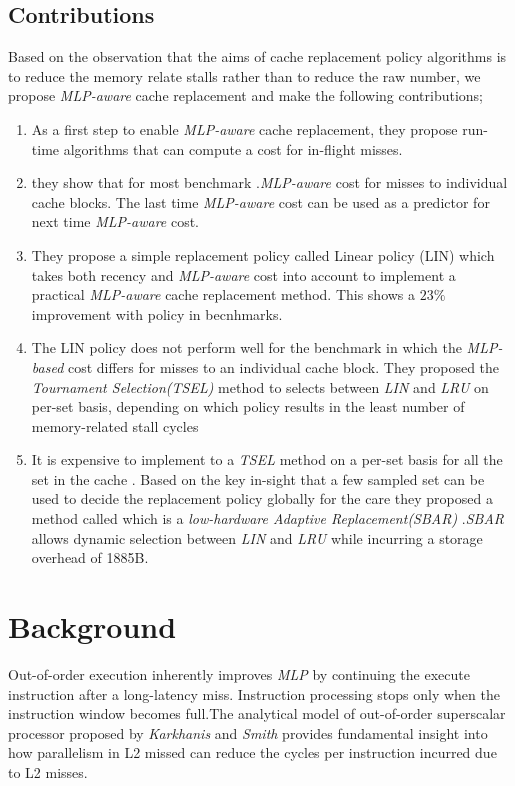 \documentclass{report}
\begin{document}
\subsection{ Contributions }
Based on the observation that the aims of  cache replacement policy algorithms is to reduce the memory relate stalls rather than to reduce the raw number, we propose \emph{MLP-aware} cache replacement and make the following contributions;
\begin{enumerate}
\item As a first step to enable \emph{MLP-aware} cache replacement, they propose run-time algorithms that can compute a cost for in-flight misses.
\item they show that for most benchmark .\emph{MLP-aware} cost for misses to individual cache blocks. The last time \emph{MLP-aware} cost can be used as  a predictor for next time \emph{MLP-aware} cost.

\item They propose a simple replacement policy called Linear policy (LIN) which takes both recency and \emph{MLP-aware} cost into account to implement a practical \emph{MLP-aware} cache replacement method. This shows a  $23\%$ improvement with policy in becnhmarks.

\item The LIN policy does not perform well for the benchmark in which the \emph{MLP-based} cost differs for misses to an individual cache block. They proposed the \emph{Tournament Selection(TSEL)} method to selects between \emph{LIN } and \emph{ LRU} on per-set basis, depending on which policy results in the least number of memory-related stall cycles

\item It is expensive to implement to a \emph{TSEL} method on a per-set basis for all the set in the cache . Based on the key in-sight that a few sampled set can be used to decide the replacement policy globally for the care they proposed a method called which is a \emph{low-hardware Adaptive Replacement(SBAR) } .\emph{SBAR} allows dynamic selection between \emph{LIN} and \emph{LRU} while incurring a storage overhead of 1885B.

\end{enumerate}

\section{Background}


Out-of-order execution inherently improves \emph{MLP}
by continuing the execute instruction after a long-latency miss. Instruction processing stops only when the instruction window becomes full.The analytical model of out-of-order superscalar processor proposed by \emph{Karkhanis} and \emph{Smith} provides fundamental insight into how parallelism in L2 missed can reduce the cycles per instruction incurred due to L2 misses.\vspace{.8cm}
\end{document}
